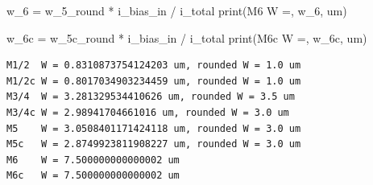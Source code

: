 \documentclass[
  a4paper,
  DIV=11,
  numbers=noendperiod]{scrartcl}
\newenvironment{Shaded}{\begin{snugshade}}{\end{snugshade}}
\newcommand{\BuiltInTok}[1]{\textcolor[rgb]{0.00,0.23,0.31}{#1}}
\newcommand{\NormalTok}[1]{\textcolor[rgb]{0.00,0.23,0.31}{#1}}
\newcommand{\OperatorTok}[1]{\textcolor[rgb]{0.37,0.37,0.37}{#1}}
\newcommand{\StringTok}[1]{\textcolor[rgb]{0.13,0.47,0.30}{#1}}
\begin{document}
\begin{tcolorbox}
\begin{Shaded}
\begin{Highlighting}[]
\NormalTok{w\_6 }\OperatorTok{=}\NormalTok{ w\_5\_round }\OperatorTok{*}\NormalTok{ i\_bias\_in }\OperatorTok{/}\NormalTok{ i\_total}
\BuiltInTok{print}\NormalTok{(}\StringTok{\textquotesingle{}M6    W =\textquotesingle{}}\NormalTok{, w\_6, }\StringTok{\textquotesingle{}um\textquotesingle{}}\NormalTok{)}

\NormalTok{w\_6c }\OperatorTok{=}\NormalTok{ w\_5c\_round }\OperatorTok{*}\NormalTok{ i\_bias\_in }\OperatorTok{/}\NormalTok{ i\_total}
\BuiltInTok{print}\NormalTok{(}\StringTok{\textquotesingle{}M6c   W =\textquotesingle{}}\NormalTok{, w\_6c, }\StringTok{\textquotesingle{}um\textquotesingle{}}\NormalTok{)}
\end{Highlighting}
\end{Shaded}

\begin{verbatim}
M1/2  W = 0.8310873754124203 um, rounded W = 1.0 um
M1/2c W = 0.8017034903234459 um, rounded W = 1.0 um
M3/4  W = 3.281329534410626 um, rounded W = 3.5 um
M3/4c W = 2.98941704661016 um, rounded W = 3.0 um
M5    W = 3.0508401171424118 um, rounded W = 3.0 um
M5c   W = 2.8749923811908227 um, rounded W = 3.0 um
M6    W = 7.500000000000002 um
M6c   W = 7.500000000000002 um
\end{verbatim}


\end{tcolorbox}
\end{document}
